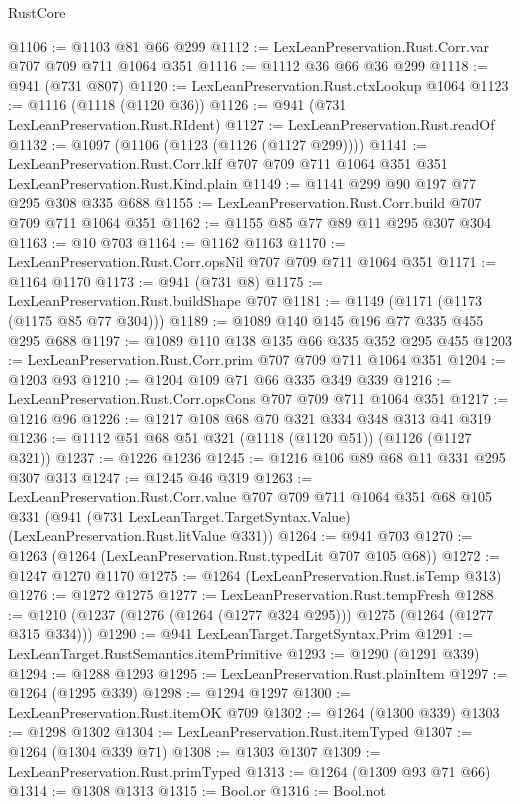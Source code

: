 \begin{lexlean}{RustCore}
\begin{coremodule}
@1106 := @1103 @81 @66 @299
@1112 := LexLeanPreservation.Rust.Corr.var @707 @709 @711 @1064 @351
@1116 := @1112 @36 @66 @36 @299
@1118 := @941 (@731 @807)
@1120 := LexLeanPreservation.Rust.ctxLookup @1064
@1123 := @1116 (@1118 (@1120 @36))
@1126 := @941 (@731 LexLeanPreservation.Rust.RIdent)
@1127 := LexLeanPreservation.Rust.readOf
@1132 := @1097 (@1106 (@1123 (@1126 (@1127 @299))))
@1141 := LexLeanPreservation.Rust.Corr.kIf
    @707
    @709
    @711
    @1064
    @351
    @351
    LexLeanPreservation.Rust.Kind.plain
@1149 := @1141 @299 @90 @197 @77 @295 @308 @335 @688
@1155 := LexLeanPreservation.Rust.Corr.build @707 @709 @711 @1064 @351
@1162 := @1155 @85 @77 @89 @11 @295 @307 @304
@1163 := @10 @703
@1164 := @1162 @1163
@1170 := LexLeanPreservation.Rust.Corr.opsNil @707 @709 @711 @1064 @351
@1171 := @1164 @1170
@1173 := @941 (@731 @8)
@1175 := LexLeanPreservation.Rust.buildShape @707
@1181 := @1149 (@1171 (@1173 (@1175 @85 @77 @304)))
@1189 := @1089 @140 @145 @196 @77 @335 @455 @295 @688
@1197 := @1089 @110 @138 @135 @66 @335 @352 @295 @455
@1203 := LexLeanPreservation.Rust.Corr.prim @707 @709 @711 @1064 @351
@1204 := @1203 @93
@1210 := @1204 @109 @71 @66 @335 @349 @339
@1216 := LexLeanPreservation.Rust.Corr.opsCons @707 @709 @711 @1064 @351
@1217 := @1216 @96
@1226 := @1217 @108 @68 @70 @321 @334 @348 @313 @41 @319
@1236 := @1112 @51 @68 @51 @321 (@1118 (@1120 @51)) (@1126 (@1127 @321))
@1237 := @1226 @1236
@1245 := @1216 @106 @89 @68 @11 @331 @295 @307 @313
@1247 := @1245 @46 @319
@1263 := LexLeanPreservation.Rust.Corr.value
    @707
    @709
    @711
    @1064
    @351
    @68
    @105
    @331
    (@941 (@731 LexLeanTarget.TargetSyntax.Value) (LexLeanPreservation.Rust.litValue @331))
@1264 := @941 @703
@1270 := @1263 (@1264 (LexLeanPreservation.Rust.typedLit @707 @105 @68))
@1272 := @1247 @1270 @1170
@1275 := @1264 (LexLeanPreservation.Rust.isTemp @313)
@1276 := @1272 @1275
@1277 := LexLeanPreservation.Rust.tempFresh
@1288 := @1210 (@1237 (@1276 (@1264 (@1277 @324 @295))) @1275 (@1264 (@1277 @315 @334)))
@1290 := @941 LexLeanTarget.TargetSyntax.Prim
@1291 := LexLeanTarget.RustSemantics.itemPrimitive
@1293 := @1290 (@1291 @339)
@1294 := @1288 @1293
@1295 := LexLeanPreservation.Rust.plainItem
@1297 := @1264 (@1295 @339)
@1298 := @1294 @1297
@1300 := LexLeanPreservation.Rust.itemOK @709
@1302 := @1264 (@1300 @339)
@1303 := @1298 @1302
@1304 := LexLeanPreservation.Rust.itemTyped
@1307 := @1264 (@1304 @339 @71)
@1308 := @1303 @1307
@1309 := LexLeanPreservation.Rust.primTyped
@1313 := @1264 (@1309 @93 @71 @66)
@1314 := @1308 @1313
@1315 := Bool.or
@1316 := Bool.not

\end{coremodule}
\end{lexlean}
